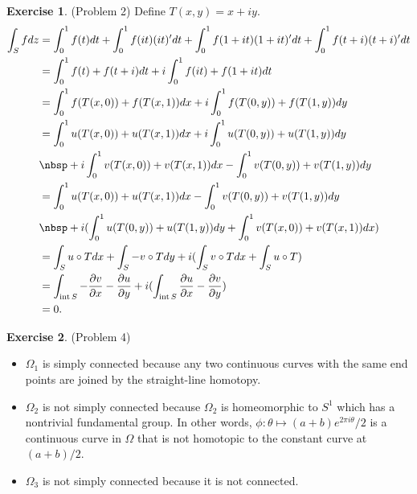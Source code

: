 \documentclass[12pt, psamsfonts]{amsart}
\theoremstyle{definition}
\newtheorem*{exer}{Exercise}
\theoremstyle{remark}
\DeclareMathOperator{\Int}{int}
\numberwithin{equation}{section}
\begin{document}
\begin{exer}{(Problem 2)}
  Define $T(x, y) = x + iy$.
  \begin{align*}
    \int_{S} fdz
      &= \int_{0}^{1} f(t)dt + \int_{0}^{1} f(it)(it)'dt + \int_{0}^{1} f(1 + it)(1 + it)'dt + \int_{0}^{1} f(t + i)(t + i)'dt \\
      &= \int_{0}^{1} f(t) + f(t + i)dt + i\int_{0}^{1} f(it) + f(1 + it) dt \\
      &= \int_{0}^{1} f(T(x, 0)) + f(T(x, 1)) dx + i\int_{0}^{1} f(T(0, y)) + f(T(1, y)) dy \\
      &= \int_{0}^{1} u(T(x, 0)) + u(T(x, 1)) dx + i\int_{0}^{1} u(T(0, y)) + u(T(1, y)) dy  \\
      &\nbsp + i\int_{0}^{1} v(T(x, 0)) + v(T(x, 1)) dx - \int_{0}^{1} v(T(0, y)) + v(T(1, y)) dy \\
      &= \int_{0}^{1} u(T(x, 0)) + u(T(x, 1)) dx - \int_{0}^{1} v(T(0, y)) + v(T(1, y)) dy \\
      &\nbsp + i(\int_{0}^{1} u(T(0, y)) + u(T(1, y)) dy + \int_{0}^{1} v(T(x, 0)) + v(T(x, 1)) dx) \\
      &= \int_{S} u \circ T dx + \int_{S} -v \circ T dy + i(\int_{S} v \circ T dx + \int_{S} u \circ T) \\
      &= \int_{\Int S} -\frac{\partial v}{\partial x} - \frac{\partial u}{\partial y} + i(\int_{\Int S} \frac{\partial u}{\partial x} - \frac{\partial v}{\partial y}) \\
      &= 0.
  \end{align*}

\end{exer}

\begin{exer}{(Problem 4)}
  \begin{itemize}
    \item
      $\Omega_1$ is simply connected because any two continuous curves with the same end points are joined by the straight-line homotopy.
    \item
      $\Omega_2$ is not simply connected because $\Omega_2$ is homeomorphic to $S^1$ which has a nontrivial fundamental group.
      In other words, $\phi: \theta \mapsto (a + b)e^{2\pi i\theta}/2$ is a continuous curve in $\Omega$ that is not homotopic to the constant curve at $(a + b) / 2$.
    \item
      $\Omega_3$ is not simply connected because it is not connected.
  \end{itemize}
\end{exer}
\end{document}
